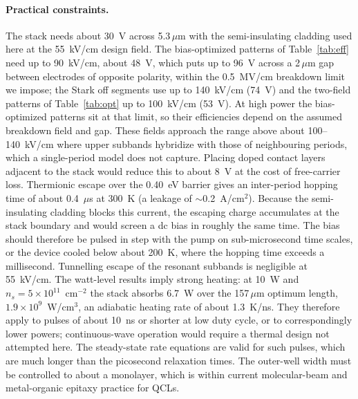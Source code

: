 \documentclass[11pt]{article}
\newcommand{\um}{\,\mu\mathrm{m}}
\begin{document}
\paragraph{Practical constraints.} The stack needs about 30~V across 5.3$\um$ with the semi-insulating cladding used here at the 55~kV/cm design field. The bias-optimized patterns of Table~\ref{tab:eff} need up to 90~kV/cm, about 48~V, which puts up to 96~V across a 2$\um$ gap between electrodes of opposite polarity, within the 0.5~MV/cm breakdown limit we impose; the Stark off segments use up to 140~kV/cm (74~V) and the two-field patterns of Table~\ref{tab:opt} up to 100~kV/cm (53~V). At high power the bias-optimized patterns sit at that limit, so their efficiencies depend on the assumed breakdown field and gap. These fields approach the range above about 100--140~kV/cm where upper subbands hybridize with those of neighbouring periods, which a single-period model does not capture. Placing doped contact layers adjacent to the stack would reduce this to about 8~V at the cost of free-carrier loss. Thermionic escape over the 0.40~eV barrier gives an inter-period hopping time of about 0.4~$\mu$s at 300~K (a leakage of $\sim$0.2~A/cm$^2$). Because the semi-insulating cladding blocks this current, the escaping charge accumulates at the stack boundary and would screen a dc bias in roughly the same time. The bias should therefore be pulsed in step with the pump on sub-microsecond time scales, or the device cooled below about 200~K, where the hopping time exceeds a millisecond. Tunnelling escape of the resonant subbands is negligible at 55~kV/cm. The watt-level results imply strong heating: at 10~W and $n_s=5\times10^{11}$~cm$^{-2}$ the stack absorbs 6.7~W over the 157$\um$ optimum length, $1.9\times10^{9}$~W/cm$^3$, an adiabatic heating rate of about 1.3~K/ns. They therefore apply to pulses of about 10~ns or shorter at low duty cycle, or to correspondingly lower powers; continuous-wave operation would require a thermal design not attempted here. The steady-state rate equations are valid for such pulses, which are much longer than the picosecond relaxation times. The outer-well width must be controlled to about a monolayer, which is within current molecular-beam and metal-organic epitaxy practice for QCLs.
\end{document}
